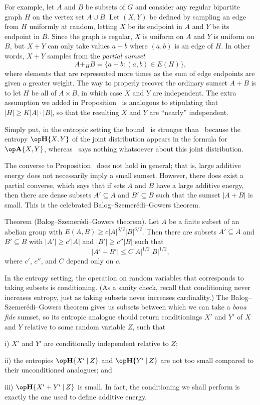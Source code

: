 For example, let $A$ and $B$ be subsets of $G$ and consider any regular bipartite graph $H$ on the
vertex set $A\cup B$. Let $(X,Y)$ be defined by sampling an edge from $H$ uniformly at random, letting
$X$ be its endpoint in $A$ and $Y$ be its endpoint in $B$. Since the graph is regular, $X$ is uniform
on $A$ and $Y$ is uniform on $B$, but $X+Y$ can only take values $a+b$ where $(a,b)$ is an edge of $H$.
In other words, $X+Y$ samples from the {\it partial sumset}
$$ A +_H B = \bigl\{ a + b : (a,b)\in E(H)\bigr\},$$
where elements that are represented more times as the sum of edge endpoints are given a greater weight.
The way to properly recover the ordinary sumset $A+B$ is to let $H$ be all of $A\times B$, in which case
$X$ and $Y$ are independent. The extra assumption we added in Proposition~{\propnaive} is analogous to
stipulating that $|H| \ge K |A|\cdot |B|$, so that the resulting $X$ and $Y$ are ``nearly'' independent.

Simply put, in the entropic setting the bound~ is
stronger than~ because the entropy $\Eta\{X,Y\}$ of the joint distribution appears in
the formula for $\AA\{X,Y\}$, whereas~ says nothing whatsoever about this joint distribution.

The converse to Proposition~{\propinversebalog} does not hold in general; that is, large additive energy
does not necessarily imply a small sumset. However, there does exist a partial converse,
which says that if sets $A$ and $B$ have a large additive energy, then there are dense subsets $A'\subseteq A$
and $B'\subseteq B$ such that the sumset $|A+B|$ is small. This is the celebrated
Balog--Szemer\'edi--Gowers theorem.

\parenproclaim Theorem {\advthm} (Balog--Szemer\'edi--Gowers theorem). Let $A$ be a finite
subset of an abelian group with $E(A,B) \ge c |A|^{3/2} |B|^{3/2}$. Then there are subsets
$A'\subseteq A$ and $B'\subseteq B$ with $|A'| \ge c' |A|$ and $|B'|\ge c''|B|$ such that
$$|A'+B'| \le C |A|^{1/2}|B|^{1/2},$$
where $c'$, $c''$, and $C$ depend only on $c$.

In the entropy setting, the operation on random variables that corresponds to taking subsets is
conditioning. (As a sanity check, recall that conditioning never increases entropy, just
as taking subsets never increases cardinality.) The Balog--Szemer\'edi--Gowers theorem gives
us subsets between which we can take a {\it bona fide} sumset, so its entropic analogue
should return conditionings $X'$ and $Y'$ of $X$ and $Y$ relative to some random variable $Z$,
such that
\medskip
\item{i)} $X'$ and $Y'$ are conditionally independent relative to $Z$;
\smallskip
\item{ii)} the entropies $\Eta\{X'\given Z\}$ and
$\Eta\{Y'\given Z\}$ are not too small compared to their unconditioned analogues; and
\smallskip
\item{iii)} $\Eta\{X'+Y'\given Z\}$ is small.
\medskip
In fact, the conditioning we shall perform is exactly the one used to define additive energy.

